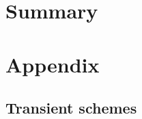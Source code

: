 \documentclass{article}
\numberwithin{equation}{section}
\begin{document}
%
	
\section{Summary}\label{sec:summary}
	

\pagebreak




\pagebreak
\appendix
\section{Appendix}

\subsection{Transient schemes}
\end{document}

